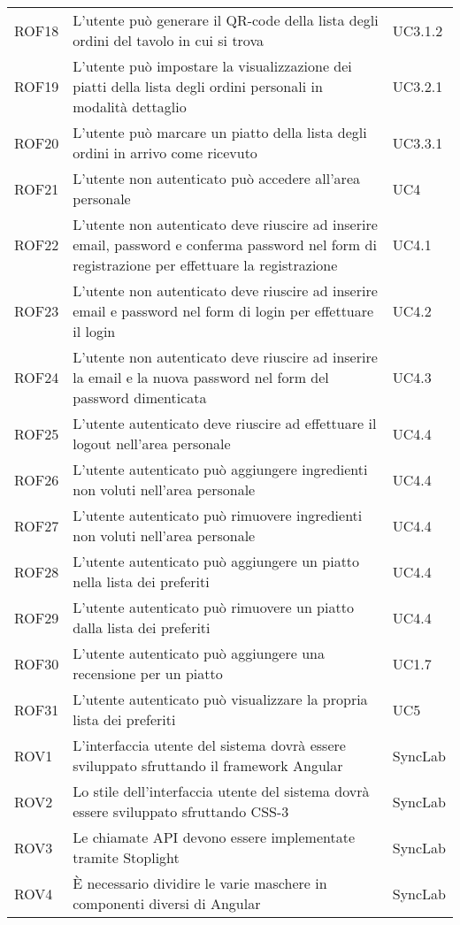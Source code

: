 \begin{center}
\begin{longtable}{ |p{1.5cm}|p{9cm}|p{1.5cm}|  }
        ROF18&L'utente può generare il QR-code della lista degli ordini del tavolo in cui si trova &UC3.1.2 \\
        ROF19&L'utente può impostare la visualizzazione dei piatti della lista degli ordini personali in modalità dettaglio&UC3.2.1 \\
        ROF20&L'utente può marcare un piatto della lista degli ordini in arrivo come ricevuto&UC3.3.1 \\
        ROF21&L'utente non autenticato può accedere all'area personale&UC4\\
        ROF22&L'utente non autenticato deve riuscire ad inserire email, password e conferma password nel form di registrazione per effettuare la registrazione &UC4.1\\
        ROF23&L'utente non autenticato deve riuscire ad inserire email e password nel form di login per effettuare il login &UC4.2\\
        ROF24&L'utente non autenticato deve riuscire ad inserire la email e la nuova password nel form del password dimenticata&UC4.3\\
        ROF25&L'utente autenticato deve riuscire ad effettuare il logout nell'area personale&UC4.4\\
        ROF26&L'utente autenticato può aggiungere ingredienti non voluti nell'area personale&UC4.4\\
        ROF27&L'utente autenticato può rimuovere ingredienti non voluti nell'area personale&UC4.4\\
        ROF28&L'utente autenticato può aggiungere un piatto nella lista dei preferiti&UC4.4\\
        ROF29&L'utente autenticato può rimuovere un piatto dalla lista dei preferiti&UC4.4\\
        ROF30&L'utente autenticato può aggiungere una recensione per un piatto&UC1.7\\
        ROF31&L'utente autenticato può visualizzare la propria lista dei preferiti&UC5\\
        ROV1&L'interfaccia utente del sistema dovrà essere sviluppato sfruttando il framework Angular&SyncLab\\
        ROV2&Lo stile dell'interfaccia utente del sistema dovrà essere sviluppato sfruttando CSS-3&SyncLab\\
        ROV3&Le chiamate API devono essere implementate tramite Stoplight&SyncLab\\
        ROV4&È necessario dividire le varie maschere in componenti diversi di Angular&SyncLab\\

\end{longtable}
\end{center}

